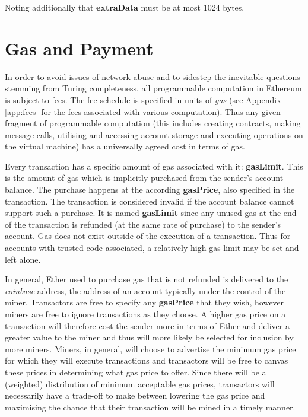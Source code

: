 \documentclass[9pt,oneside]{amsart}
\begin{document}
\begin{multicols}{2}
Noting additionally that \textbf{extraData} must be at most 1024 bytes.

\section{Gas and Payment} \label{ch:payment}

In order to avoid issues of network abuse and to sidestep the inevitable questions stemming from Turing completeness, all programmable computation in Ethereum is subject to fees. The fee schedule is specified in units of \textit{gas} (see Appendix \ref{app:fees} for the fees associated with various computation). Thus any given fragment of programmable computation (this includes creating contracts, making message calls, utilising and accessing account storage and executing operations on the virtual machine) has a universally agreed cost in terms of gas.

Every transaction has a specific amount of gas associated with it: \textbf{gasLimit}. This is the amount of gas which is implicitly purchased from the sender's account balance. The purchase happens at the according \textbf{gasPrice}, also specified in the transaction. The transaction is considered invalid if the account balance cannot support such a purchase. It is named \textbf{gasLimit} since any unused gas at the end of the transaction is refunded (at the same rate of purchase) to the sender's account. Gas does not exist outside of the execution of a transaction. Thus for accounts with trusted code associated, a relatively high gas limit may be set and left alone.

In general, Ether used to purchase gas that is not refunded is delivered to the \textit{coinbase} address, the address of an account typically under the control of the miner. Transactors are free to specify any \textbf{gasPrice} that they wish, however miners are free to ignore transactions as they choose. A higher gas price on a transaction will therefore cost the sender more in terms of Ether and deliver a greater value to the miner and thus will more likely be selected for inclusion by more miners. Miners, in general, will choose to advertise the minimum gas price for which they will execute transactions and transactors will be free to canvas these prices in determining what gas price to offer. Since there will be a (weighted) distribution of minimum acceptable gas prices, transactors will necessarily have a trade-off to make between lowering the gas price and maximising the chance that their transaction will be mined in a timely manner.


\end{multicols}
\end{document}
